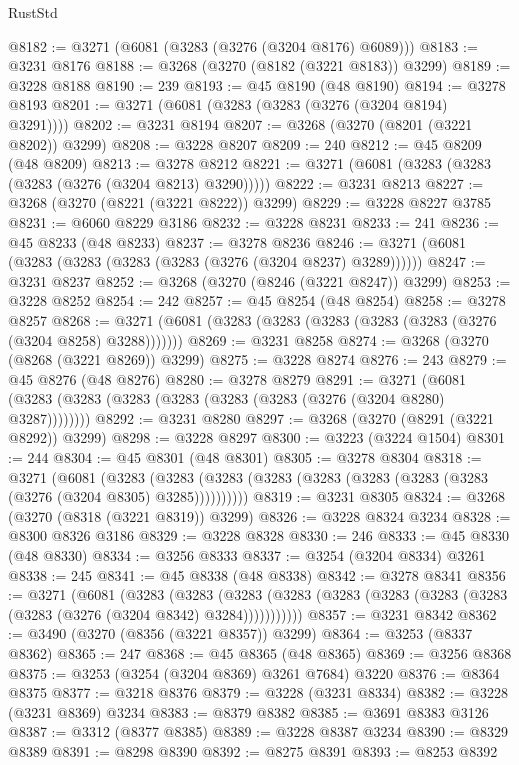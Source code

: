 \begin{lexlean}{RustStd}
\begin{coremodule}
@8182 := @3271 (@6081 (@3283 (@3276 (@3204 @8176) @6089)))
@8183 := @3231 @8176
@8188 := @3268 (@3270 (@8182 (@3221 @8183)) @3299)
@8189 := @3228 @8188
@8190 := 239
@8193 := @45 @8190 (@48 @8190)
@8194 := @3278 @8193
@8201 := @3271 (@6081 (@3283 (@3283 (@3276 (@3204 @8194) @3291))))
@8202 := @3231 @8194
@8207 := @3268 (@3270 (@8201 (@3221 @8202)) @3299)
@8208 := @3228 @8207
@8209 := 240
@8212 := @45 @8209 (@48 @8209)
@8213 := @3278 @8212
@8221 := @3271 (@6081 (@3283 (@3283 (@3283 (@3276 (@3204 @8213) @3290)))))
@8222 := @3231 @8213
@8227 := @3268 (@3270 (@8221 (@3221 @8222)) @3299)
@8229 := @3228 @8227 @3785
@8231 := @6060 @8229 @3186
@8232 := @3228 @8231
@8233 := 241
@8236 := @45 @8233 (@48 @8233)
@8237 := @3278 @8236
@8246 := @3271 (@6081 (@3283 (@3283 (@3283 (@3283 (@3276 (@3204 @8237) @3289))))))
@8247 := @3231 @8237
@8252 := @3268 (@3270 (@8246 (@3221 @8247)) @3299)
@8253 := @3228 @8252
@8254 := 242
@8257 := @45 @8254 (@48 @8254)
@8258 := @3278 @8257
@8268 := @3271 (@6081 (@3283 (@3283 (@3283 (@3283 (@3283 (@3276 (@3204 @8258) @3288)))))))
@8269 := @3231 @8258
@8274 := @3268 (@3270 (@8268 (@3221 @8269)) @3299)
@8275 := @3228 @8274
@8276 := 243
@8279 := @45 @8276 (@48 @8276)
@8280 := @3278 @8279
@8291 := @3271 (@6081 (@3283 (@3283 (@3283 (@3283 (@3283 (@3283 (@3276 (@3204 @8280) @3287))))))))
@8292 := @3231 @8280
@8297 := @3268 (@3270 (@8291 (@3221 @8292)) @3299)
@8298 := @3228 @8297
@8300 := @3223 (@3224 @1504)
@8301 := 244
@8304 := @45 @8301 (@48 @8301)
@8305 := @3278 @8304
@8318 := @3271
    (@6081
      (@3283 (@3283 (@3283 (@3283 (@3283 (@3283 (@3283 (@3283 (@3276 (@3204 @8305) @3285))))))))))
@8319 := @3231 @8305
@8324 := @3268 (@3270 (@8318 (@3221 @8319)) @3299)
@8326 := @3228 @8324 @3234
@8328 := @8300 @8326 @3186
@8329 := @3228 @8328
@8330 := 246
@8333 := @45 @8330 (@48 @8330)
@8334 := @3256 @8333
@8337 := @3254 (@3204 @8334) @3261
@8338 := 245
@8341 := @45 @8338 (@48 @8338)
@8342 := @3278 @8341
@8356 := @3271
    (@6081
      (@3283
        (@3283
          (@3283 (@3283 (@3283 (@3283 (@3283 (@3283 (@3283 (@3276 (@3204 @8342) @3284)))))))))))
@8357 := @3231 @8342
@8362 := @3490 (@3270 (@8356 (@3221 @8357)) @3299)
@8364 := @3253 (@8337 @8362)
@8365 := 247
@8368 := @45 @8365 (@48 @8365)
@8369 := @3256 @8368
@8375 := @3253 (@3254 (@3204 @8369) @3261 @7684) @3220
@8376 := @8364 @8375
@8377 := @3218 @8376
@8379 := @3228 (@3231 @8334)
@8382 := @3228 (@3231 @8369) @3234
@8383 := @8379 @8382
@8385 := @3691 @8383 @3126
@8387 := @3312 (@8377 @8385)
@8389 := @3228 @8387 @3234
@8390 := @8329 @8389
@8391 := @8298 @8390
@8392 := @8275 @8391
@8393 := @8253 @8392

\end{coremodule}
\end{lexlean}
